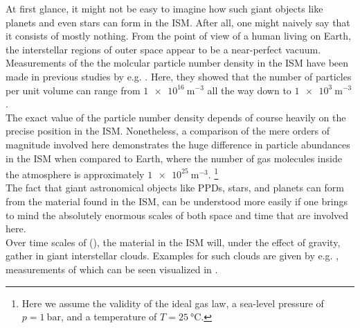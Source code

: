    At first glance, it might not be easy to imagine how such giant objects like planets and 
    even stars can form in the ISM. After all, one might naively say that it consists of mostly
    nothing. From the point of view of a human living on Earth, the interstellar regions of
    outer space appear to be a near-perfect vacuum. \\

    Measurements of the the molcular particle number density in the ISM have been made in 
    previous studies by e.g. \cite{burton_2013}. Here, they showed that the number of particles 
    per unit volume can range from $\SI{1e16}{\meter^{-3}}$ all the way down to 
    $\SI{1e3}{\meter^{-3}}$. \\

    The exact value of the particle number density depends of course heavily on the precise 
    position in the ISM. Nonetheless, a comparison of the mere orders of magnitude involved 
    here demonstrates the huge difference in particle abundances in the ISM when compared to 
    Earth, where the number of gas molecules inside the atmosphere is approximately 
    $\SI{1e25}{\meter^{-3}}$.
    \footnote{Here we assume the validity of the ideal gas law, a sea-level pressure of 
              $p=\SI{1}{\bar}$, and a temperature of $T=\SI{25}{\celsius}$.}
    \\

    The fact that giant astronomical objects like PPDs, stars, and planets can form from the 
    material found in the ISM, can be understood more easily if one brings to mind the
    absolutely enormous scales of both space and time that are involved here. \\

    Over time scales of (), the material in the ISM 
    will, under the effect of gravity, gather in giant interstellar clouds. Examples for such 
    clouds are given by e.g. , measurements of which can be seen 
    visualized in . \\


    

